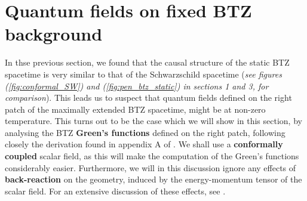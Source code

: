 %
\section{Quantum fields on fixed BTZ background}
In thse previous section, we found that the causal structure of the static BTZ spacetime is very similar to that of the Schwarzschild spacetime (\textit{see figures (\ref{fig:conformal_SW}) and (\ref{fig:pen_btz_static}) in sections 1 and 3, for comparison}). This leads us to suspect that quantum fields defined on the right patch of the maximally extended BTZ spacetime, might be at non-zero temperature. This turns out to be the case which we will show in this section, by analysing the BTZ \textbf{Green's functions} defined on the right patch, following closely the derivation found in appendix A of \cite{Green}. We shall use a \textbf{conformally coupled} scalar field, as this will make the computation of the Green's functions considerably easier. Furthermore, we will in this discussion ignore any effects of \textbf{back-reaction} on the geometry, induced by the energy-momentum tensor of the scalar field. For an extensive discussion of these effects, see \cite{Green}.

